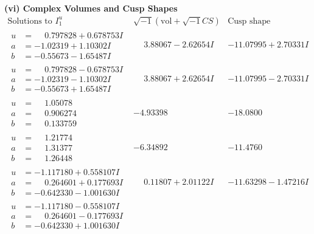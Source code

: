 \documentclass[1p]{elsarticle_modified}
\theoremstyle{definition}
\newcommand{\I}{\sqrt{-1}}
\begin{document}
\newpage\flushleft \textbf{(vi) Complex Volumes and Cusp Shapes}
$$\begin{array}{c|c|c}  
\text{Solutions to }I^u_{1}& \I (\text{vol} + \sqrt{-1}CS) & \text{Cusp shape}\\
 \hline 
\begin{aligned}
u &= \phantom{-}0.797828 + 0.678753 I \\
a &= -1.02319 + 1.10302 I \\
b &= -0.55673 - 1.65487 I\end{aligned}
 & \phantom{-}3.88067 - 2.62654 I & -11.07995 + 2.70331 I \\ \hline\begin{aligned}
u &= \phantom{-}0.797828 - 0.678753 I \\
a &= -1.02319 - 1.10302 I \\
b &= -0.55673 + 1.65487 I\end{aligned}
 & \phantom{-}3.88067 + 2.62654 I & -11.07995 - 2.70331 I \\ \hline\begin{aligned}
u &= \phantom{-}1.05078\phantom{ +0.000000I} \\
a &= \phantom{-}0.906274\phantom{ +0.000000I} \\
b &= \phantom{-}0.133759\phantom{ +0.000000I}\end{aligned}
 & -4.93398\phantom{ +0.000000I} & -18.0800\phantom{ +0.000000I} \\ \hline\begin{aligned}
u &= \phantom{-}1.21774\phantom{ +0.000000I} \\
a &= \phantom{-}1.31377\phantom{ +0.000000I} \\
b &= \phantom{-}1.26448\phantom{ +0.000000I}\end{aligned}
 & -6.34892\phantom{ +0.000000I} & -11.4760\phantom{ +0.000000I} \\ \hline\begin{aligned}
u &= -1.117180 + 0.558107 I \\
a &= \phantom{-}0.264601 + 0.177693 I \\
b &= -0.642330 - 1.001630 I\end{aligned}
 & \phantom{-}0.11807 + 2.01122 I & -11.63298 - 1.47216 I \\ \hline\begin{aligned}
u &= -1.117180 - 0.558107 I \\
a &= \phantom{-}0.264601 - 0.177693 I \\
b &= -0.642330 + 1.001630 I\end{aligned}

\end{array}$$
\end{document}
